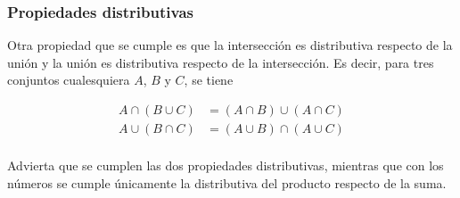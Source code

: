 



\subsubsection{Propiedades distributivas}

Otra propiedad que se cumple es que la intersección es distributiva respecto
de la unión y la unión es distributiva respecto de la intersección. Es
decir, para tres conjuntos cualesquiera $A$, $B$ y $C$, se tiene

\begin{align*}
  A \cap (B \cup C) &= (A \cap B) \cup (A \cap C) \\
  A \cup (B \cap C) &= (A \cup B) \cap (A \cup C) \\
\end{align*}

Advierta que se cumplen las dos propiedades distributivas, mientras que con
los números se cumple únicamente la distributiva del producto respecto de la
suma.

